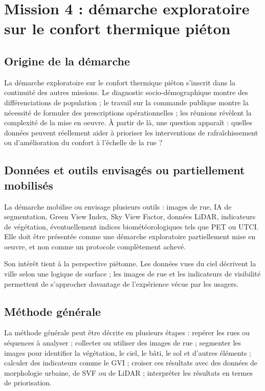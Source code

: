\documentclass[11pt,a4paper]{report}
\begin{document}
\section{Mission 4 : démarche exploratoire sur le confort thermique piéton}

\subsection{Origine de la démarche}

La démarche exploratoire sur le confort thermique piéton s'inscrit dans la continuité des autres missions. Le diagnostic socio-démographique montre des différenciations de population ; le travail sur la commande publique montre la nécessité de formuler des prescriptions opérationnelles ; les réunions révèlent la complexité de la mise en oeuvre. À partir de là, une question apparaît : quelles données peuvent réellement aider à prioriser les interventions de rafraîchissement ou d'amélioration du confort à l'échelle de la rue ?

\subsection{Données et outils envisagés ou partiellement mobilisés}

La démarche mobilise ou envisage plusieurs outils : images de rue, IA de segmentation, Green View Index, Sky View Factor, données LiDAR, indicateurs de végétation, éventuellement indices biométéorologiques tels que PET ou UTCI. Elle doit être présentée comme une démarche exploratoire partiellement mise en oeuvre, et non comme un protocole complètement achevé.

Son intérêt tient à la perspective piétonne. Les données vues du ciel décrivent la ville selon une logique de surface ; les images de rue et les indicateurs de visibilité permettent de s'approcher davantage de l'expérience vécue par les usagers.

\subsection{Méthode générale}

La méthode générale peut être décrite en plusieurs étapes : repérer les rues ou séquences à analyser ; collecter ou utiliser des images de rue ; segmenter les images pour identifier la végétation, le ciel, le bâti, le sol et d'autres éléments ; calculer des indicateurs comme le GVI ; croiser ces résultats avec des données de morphologie urbaine, de SVF ou de LiDAR ; interpréter les résultats en termes de priorisation.
\end{document}
